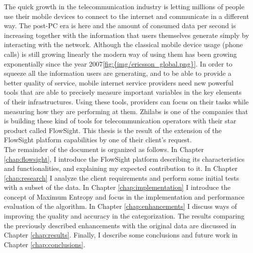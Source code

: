 
The quick growth in the telecommunication industry is letting millions of people use their mobile devices to connect to the internet and communicate in a different way. The post-PC era is here and
the amount of consumed data per second is increasing together with the information that users themselves generate simply by interacting with the network.
Although the classical mobile device usage (phone calls) is still growing linearly the modern way of using them has been growing exponentially since the year 2007\ref{fig:{img/ericsson_global.png}}.
In order to squeeze all the information users are generating, and to be able to provide a better quality of service, mobile internet service providers need new powerful tools that are able to precisely
measure important variables in the key elements of their infrastructures. Using these tools, providers can focus on their tasks while measuring how they are performing at them.
Zhilabs is one of the companies that is building these kind of tools for telecommunication operators with their star product called FlowSight\cite{flowsight}. 
This thesis is the result of the extension of the FlowSight platform capabilities by one of their client's request.  \\ 
The remainder of the document is organized as follows. In Chapter \ref{chap:flowsight}, I introduce the FlowSight platform describing its characteristics and functionalities, and explaining my
expected contribution to it. In Chapter \ref{chap:research} I analyze the client requirements and perform some initial tests with a subset of the data. In Chapter \ref{chap:implementation} I introduce
the concept of Maximum Entropy and focus in the implementation and performance evaluation of the algorithm. In Chapter \ref{chap:enhancements} I discuss ways of improving the quality and accuracy
in the categorization. The results comparing the previously described enhancements with the original data are discussed in Chapter \ref{chap:results}. Finally, I describe some conclusions and future 
work in Chapter \ref{chap:conclusions}.
